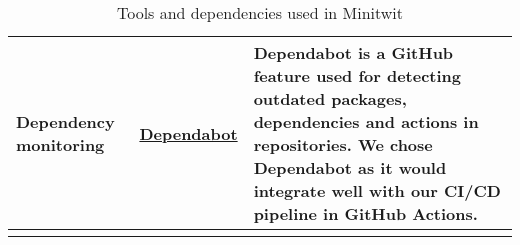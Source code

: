 \begin{longtable}{|p{}|p{} | p{}|}
    \hline
    Dependency monitoring & \href{https://docs.github.com/en/code-security/dependabot}{Dependabot} & Dependabot is a GitHub feature used for detecting outdated packages, dependencies and actions in repositories. We chose Dependabot as it would integrate well with our CI/CD pipeline in GitHub Actions. \\
    \hline
    \caption{Tools and dependencies used in Minitwit}
    \label{tab:tool}
\end{longtable}
